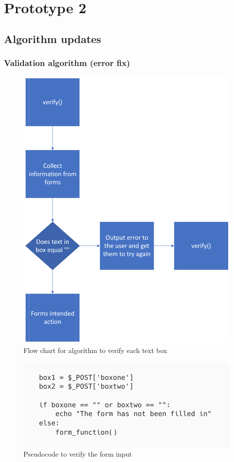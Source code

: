 \section{Prototype 2}
\subsection{Algorithm updates}
\subsubsection{Validation algorithm (error fix)}
 \begin{figure}[H]
     \centering
     \includegraphics[scale=0.2]{ch3_developing/proto2/proto1_generalvalid.png}
     \caption{Flow chart for algorithm to verify each text box}
     \label{fig:proto1_generalvalid}
 \end{figure}
 \begin{figure}[H]
     \centering
     \includegraphics[scale=0.4]{ch3_developing/proto2/proto1_alg_valid.png}
     \caption{Pseudocode to verify the form input}
     \label{fig:proto1_algvalid}
 \end{figure}
